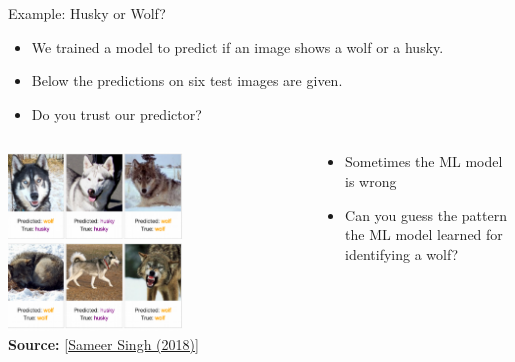 \documentclass[11pt,compress,t,notes=noshow, aspectratio=169, xcolor=table]{beamer}
\begin{document}
\begin{vbframe}[c]{Example: Husky or Wolf?}
	\begin{itemize}
		\item We trained a model to predict if an image shows a wolf or a husky. 
		\item Below the predictions on six test images are given. 
		\item Do you trust our predictor? 
	\end{itemize}
	
	\begin{columns}
	
	\begin{column}{0.6\textwidth}
	    
    	\begin{center}
    		\includegraphics[width=0.6\textwidth]{figure/lime-wolfhusky.png}\\
    		\includegraphics[width=0.6\textwidth]{figure/lime-wolfhusky2.png}\\
    		{\textbf{Source:} [\href{http://www.facweb.iitkgp.ac.in/~niloy/COURSE/Spring2018/IntelligentSystem/PPT_2018/why_should_i_trust_ppt.pdf}{Sameer Singh (2018)}]}
    	\end{center}
	    
	\end{column}
	
	\begin{column}{0.4\textwidth}
	    
	\begin{itemize}
		\item Sometimes the ML model is wrong
		\item Can you guess the pattern the ML model learned for identifying a wolf?
	\end{itemize}
	    
	\end{column}
	    
	\end{columns}

\end{vbframe}
\end{document}
